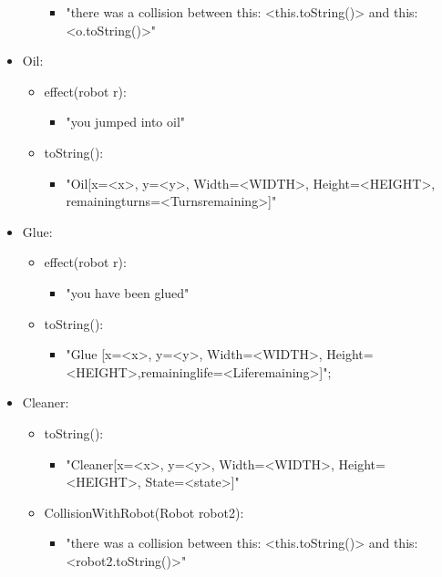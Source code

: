 \begin{itemize}
\begin{itemize}
	        \begin{itemize}
	        \item  "there was a collision between this: <this.toString()> and this: <o.toString()>"
	        
	        \end{itemize}
	\end{itemize}
	
	
\item Oil:
	\begin{itemize}
	\item effect(robot r):
	        \begin{itemize}
	        \item  "you jumped into oil"
	        \end{itemize}
	\item toString():
	       \begin{itemize}
	        \item "Oil[x=<x>, y=<y>, Width=<WIDTH>, Height=<HEIGHT>, remainingturns=<Turnsremaining>]"
	       \end{itemize}
	\end{itemize}
\item Glue:
	\begin{itemize}
	\item effect(robot r):
	        \begin{itemize}
	        \item "you have been glued"
	        \end{itemize}
	\item toString():
	       \begin{itemize}
	        \item"Glue [x=<x>, y=<y>, Width=<WIDTH>, Height=<HEIGHT>,remaininglife=<Liferemaining>]";
	       \end{itemize}
	\end{itemize}

\item Cleaner:
	\begin{itemize}
	\item toString():
	       \begin{itemize}
	        \item "Cleaner[x=<x>, y=<y>, Width=<WIDTH>, Height=<HEIGHT>, State=<state>]"
	       \end{itemize}
	 \item CollisionWithRobot(Robot robot2):     
	        \begin{itemize}
	        \item  "there was a collision between this: <this.toString()> and this: <robot2.toString()>"
	        

\end{itemize}
\end{itemize}
\end{itemize}

